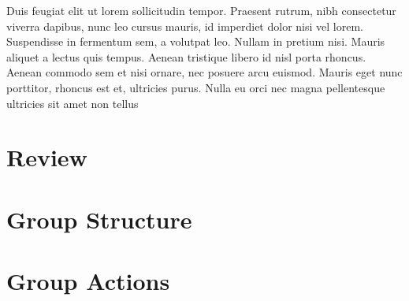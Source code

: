 \documentclass{bookneue}
\begin{document}
Duis feugiat elit ut lorem sollicitudin tempor. Praesent rutrum, nibh consectetur viverra dapibus, nunc leo cursus mauris, id imperdiet dolor nisi vel lorem. Suspendisse in fermentum sem, a volutpat leo. Nullam in pretium nisi. Mauris aliquet a lectus quis tempus. Aenean tristique libero id nisl porta rhoncus. Aenean commodo sem et nisi ornare, nec posuere arcu euismod. Mauris eget nunc porttitor, rhoncus est et, ultricies purus. Nulla eu orci nec magna pellentesque ultricies sit amet non tellus

\tableofcontents

\vfill\pagebreak

\thispagestyle{empty}

\mainmatter

\chapter{Review}



\vfill\pagebreak



\vfill\pagebreak

\chapter{Group Structure}



\vfill\pagebreak



\vfill\pagebreak



\vfill\pagebreak



\vfill\pagebreak



\vfill\pagebreak

\chapter{Group Actions}



\vfill\pagebreak



\vfill\pagebreak


\end{document}
